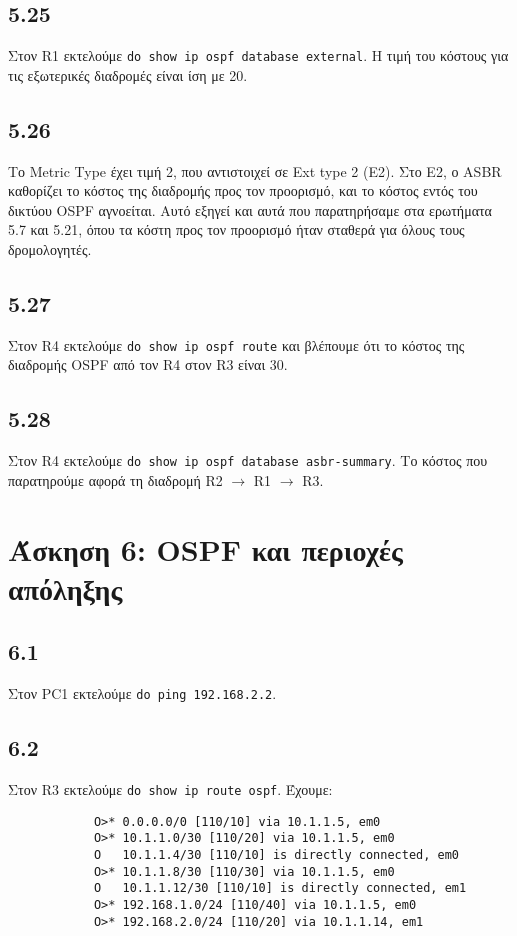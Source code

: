 \documentclass[a4paper, 12pt]{article}
\begin{document}
	\subsection*{5.25}
		Στον R1 εκτελούμε \verb|do show ip ospf database external|. Η τιμή του κόστους για τις εξωτερικές διαδρομές είναι ίση με 20.

	\subsection*{5.26}
		Το Metric Type έχει τιμή 2, που αντιστοιχεί σε Ext type 2 (E2). Στο E2, ο ASBR καθορίζει το κόστος της διαδρομής προς τον προορισμό, και το κόστος εντός του δικτύου OSPF αγνοείται. Αυτό εξηγεί και αυτά που παρατηρήσαμε στα ερωτήματα 5.7 και 5.21, όπου τα κόστη προς τον προορισμό ήταν σταθερά για όλους τους δρομολογητές. 

	\subsection*{5.27}
		Στον R4 εκτελούμε \verb|do show ip ospf route| και βλέπουμε ότι το κόστος της διαδρομής OSPF από τον R4 στον R3 είναι 30.

	\subsection*{5.28}
		Στον R4 εκτελούμε \verb|do show ip ospf database asbr-summary|. Το κόστος που παρατηρούμε αφορά τη διαδρομή R2 $\rightarrow$ R1 $\rightarrow$ R3.

\section*{Άσκηση 6: OSPF και περιοχές απόληξης}

	\subsection*{6.1}
		Στον PC1 εκτελούμε \verb|do ping 192.168.2.2|.

	\subsection*{6.2}
		Στον R3 εκτελούμε \verb|do show ip route ospf|. Έχουμε:
		
		\begin{verbatim}
			O>* 0.0.0.0/0 [110/10] via 10.1.1.5, em0
			O>* 10.1.1.0/30 [110/20] via 10.1.1.5, em0
			O   10.1.1.4/30 [110/10] is directly connected, em0
			O>* 10.1.1.8/30 [110/30] via 10.1.1.5, em0
			O   10.1.1.12/30 [110/10] is directly connected, em1
			O>* 192.168.1.0/24 [110/40] via 10.1.1.5, em0
			O>* 192.168.2.0/24 [110/20] via 10.1.1.14, em1
		\end{verbatim}
\end{document}
